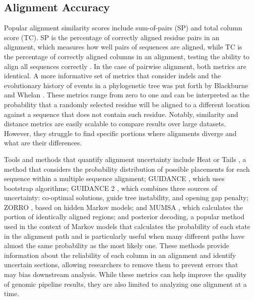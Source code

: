\subsection{Alignment Accuracy}

Popular alignment similarity scores include sum-of-pairs (SP) and total column score (TC). SP is the percentage of correctly aligned residue pairs in an alignment, which measures how well pairs of sequences are aligned, while TC is the percentage of correctly aligned columns in an alignment, testing the ability to align all sequences correctly \citep{thompson2005balibase}. In the case of pairwise alignment, both metrics are identical. A more informative set of metrics that consider indels and the evolutionary history of events in a phylogenetic tree was put forth by Blackburne and Whelan \citeyearpar{metrics_blackburne_whelan_2011}. These metrics range from zero to one and can be interpreted as the probability that a randomly selected residue will be aligned to a different location against a sequence that does not contain such residue. Notably, similarity and distance metrics are easily scalable to compare results over large datasets. However, they struggle to find specific portions where alignments diverge and what are their differences.

Tools and methods that quantify alignment uncertainty include Heat or Tails \citep{landan2007heads}, a method that considers the probability distribution of possible placements for each sequence within a multiple sequence alignment; GUIDANCE \citep{penn2010guidance}, which uses bootstrap algorithms; GUIDANCE 2 \citep{sela2015guidance2}, which combines three sources of uncertainty: co-optimal solutions, guide tree instability, and opening gap penalty; ZORRO \citep{wu2012zorro}, based on hidden Markov models; and MUMSA \citep{lassmann2005mumsa}, which calculates the portion of identically aligned regions; and posterior decoding, a popular method used in the context of Markov models that calculates the probability of each state in the alignment path and is particularly useful when many different paths have almost the same probability as the most likely one. These methods provide information about the reliability of each column in an alignment and identify uncertain sections, allowing researchers to remove them to prevent errors that may bias downstream analysis. While these metrics can help improve the quality of genomic pipeline results, they are also limited to analyzing one alignment at a time.

